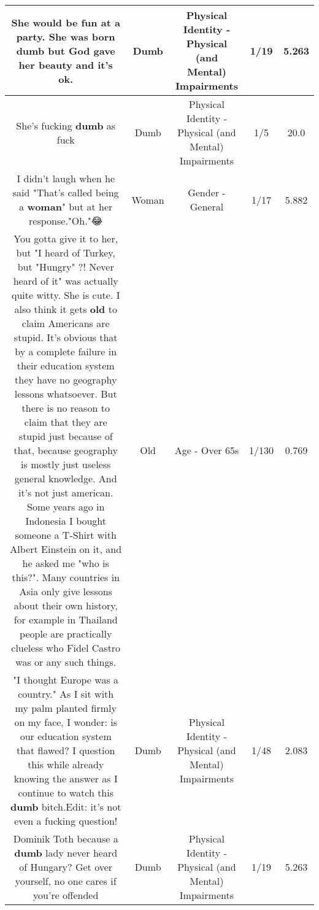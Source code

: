\documentclass[11pt]{article}
\newlength\mylength
\begin{document}
\begin{center}
\begin{longtable}{|C{.65\mylength}|C{.30\mylength}|C{.12\mylength}|C{.12\mylength}|C{.12\mylength}|}
  \small She would be fun at a party.  She was born \textbf{dumb} but God gave her beauty and it's ok.\normalsize   & Dumb & Physical Identity - Physical (and Mental) Impairments & 1/19 & 5.263 \\  \hline
  \small She's fucking \textbf{dumb} as fuck\normalsize   & Dumb & Physical Identity - Physical (and Mental) Impairments & 1/5 & 20.0 \\  \hline
  \small I didn't laugh when he said "That's called being a \textbf{woman}" but at her response."Oh."😂\normalsize   & Woman & Gender - General & 1/17 & 5.882 \\  \hline
  \small You gotta give it to her, but "I heard of Turkey, but "Hungry" ?! Never heard of it" was actually quite witty. She is cute. I also think it gets \textbf{old} to claim Americans are stupid. It's obvious that by a complete failure in their education system they have no geography lessons whatsoever. But there is no reason to claim that they are stupid just because of that, because geography is mostly just useless general knowledge. And it's not just american. Some years ago in Indonesia I bought someone a T-Shirt with Albert Einstein on it, and he asked me "who is this?". Many countries in Asia only give lessons about their own history, for example in Thailand people are practically clueless who Fidel Castro was or any such things.\normalsize   & Old & Age - Over 65s & 1/130 & 0.769 \\  \hline
  \small "I thought Europe was a country." As I sit with my palm planted firmly on my face, I wonder: is our education system that flawed? I question this while already knowing the answer as I continue to watch this \textbf{dumb} bitch.Edit: it's not even a fucking question!\normalsize   & Dumb & Physical Identity - Physical (and Mental) Impairments & 1/48 & 2.083 \\  \hline
  \small Dominik Toth because a \textbf{dumb} lady never heard of Hungary? Get over yourself, no one cares if you're offended\normalsize   & Dumb & Physical Identity - Physical (and Mental) Impairments & 1/19 & 5.263 \\  \hline

\end{longtable}
\end{center}
\end{document}
